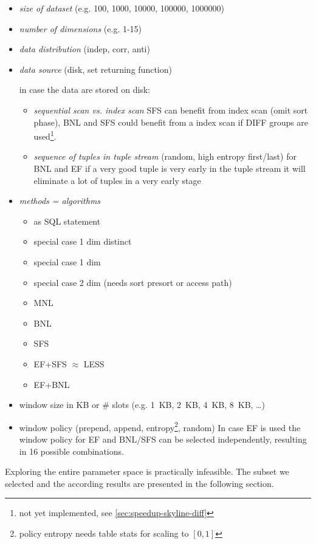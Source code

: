 \begin{itemize}
\item \emph{size of dataset} (e.g. 100, 1000, 10000, 100000, 1000000)
\item \emph{number of dimensions} (e.g. 1-15)
\item \emph{data distribution} (indep, corr, anti)
\item \emph{data source} (disk, set returning function)

in case the data are stored on disk:
\begin{itemize}
\item 
\emph{sequential scan vs. index scan} SFS can benefit from index scan
(omit sort phase), BNL and SFS could benefit from a index scan if
DIFF groups are used\footnote{not yet implemented, see \autoref{sec:speedup-skyline-diff}}.

\item 
\emph{sequence of tuples in tuple stream} 
(random, high entropy first/last) for BNL and EF if a very good tuple
is very early in the tuple stream it will eliminate a lot of tuples in
a very early stage
\end{itemize}
\item \emph{methods = algorithms}

\begin{itemize}
\item as SQL statement
\item special case 1 dim distinct
\item special case 1 dim 
\item special case 2 dim (needs sort presort or access path)
\item MNL
\item BNL
\item SFS
\item EF+SFS $\approx$ LESS
\item EF+BNL
\end{itemize}

\item window size in KB or \# slots (e.g. 1~KB, 2~KB, 4~KB, 8~KB, \ldots)
\item
window policy (prepend, append, entropy\footnote{policy entropy needs
table stats for scaling to $[0,1]$}, random) In case EF is used the
window policy for EF and BNL/SFS can be selected independently,
resulting in 16 possible combinations.
\end{itemize}

Exploring the entire parameter space is practically infeasible.  The
subset we selected and the according results are presented in the
following section.

